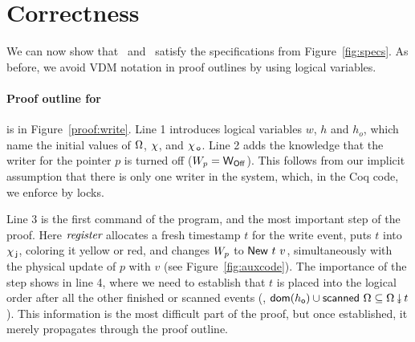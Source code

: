 \section{Correctness}
\label{sc:proof}



We can now show that \jywrite\ and \jyscan\ satisfy the specifications
from Figure~\ref{fig:specs}.  As before, we avoid VDM notation in
proof outlines by using logical variables.
%
%
%
%
%
%

\paragraph{Proof outline for \jywrite} is in Figure~\ref{proof:write}. 
%
Line 1 introduces logical variables $w$, $h$ and $h_o$, which name the
initial values of $\Omega$, $\chi$, and $\chi_{\, \mathsf{o}}$.
%
Line 2 adds the knowledge that the writer for the pointer $p$ is
turned off ($W_p = \mathsf{W_{Off}}$). This follows from our implicit
assumption that there is only one writer in the system, which, in the
Coq code, we enforce by locks.

Line 3 is the first command of the program, and the most important
step of the proof. Here $\textit{register}$ allocates a fresh timestamp
$t$ for the write event, puts $t$ into $\chi_{\, \mathsf{j}}$, coloring it yellow or
red, and changes $W_p$ to $\mathsf{New}\ t\ v$, simultaneously with the
physical update of $p$ with $v$ (see Figure~\ref{fig:auxcode}). The
importance of the step shows in line 4, where we need to establish
that $t$ is placed into the logical order after all the other finished
or scanned events (\ie, $ \dom{h_\othersub} \cup \scanned\,
\stableorder \subseteq \sideal{\stableorder}{t}$). This information is
the most difficult part of the proof, but once established, it merely
propagates through the proof outline.

